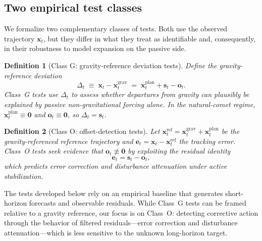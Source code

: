 \documentclass{article}
\newtheorem{definition}{Definition}
\begin{document}
\subsection{Two empirical test classes}
\label{sec:tests}

We formalize two complementary classes of tests. Both use the observed trajectory $\mathbf{x}_t$, but they differ in what they treat as identifiable and, consequently, in their robustness to model expansion on the passive side.

\begin{definition}[Class G: gravity-reference deviation tests]
\label{def:classG}
Define the gravity-reference deviation
\begin{equation}
\Delta_t \;\equiv\; \mathbf{x}_t - \mathbf{x}^{\mathrm{grav}}_t
\;=\;
\mathbf{x}^{\mathrm{plan}}_t + \mathbf{s}_t - \mathbf{o}_t.
\label{eq:delta_def}
\end{equation}
Class~G tests use $\Delta_t$ to assess whether departures from gravity can plausibly be explained by passive non-gravitational forcing alone. In the natural-comet regime, $\mathbf{x}^{\mathrm{plan}}_t\equiv\mathbf{0}$ and $\mathbf{o}_t\equiv\mathbf{0}$, so $\Delta_t=\mathbf{s}_t$.
\end{definition}

\begin{definition}[Class O: offset-detection tests]
\label{def:classO}
Let $\mathbf{x}^{\mathrm{ref}}_t=\mathbf{x}^{\mathrm{grav}}_t+\mathbf{x}^{\mathrm{plan}}_t$ be the gravity-referenced reference trajectory and $\mathbf{e}_t=\mathbf{x}_t-\mathbf{x}^{\mathrm{ref}}_t$ the tracking error. Class~O tests seek evidence that $\mathbf{o}_t\not\equiv\mathbf{0}$ by exploiting the residual identity
\begin{equation}
\mathbf{e}_t = \mathbf{s}_t - \mathbf{o}_t,
\label{eq:classO_core}
\end{equation}
which predicts error correction and disturbance attenuation under active stabilization.
\end{definition}

The tests developed below rely on an empirical baseline that generates short-horizon forecasts and observable residuals. While Class~G tests can be framed relative to a gravity reference, our focus is on Class~O: detecting corrective action through the behavior of filtered residuals---error correction and disturbance attenuation---which is less sensitive to the unknown long-horizon target.
\end{document}
